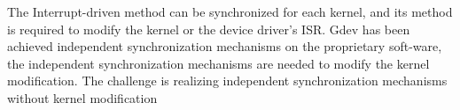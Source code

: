 The Interrupt-driven method can be synchronized for each kernel, and its method is required to modify the kernel or the device driver's ISR.
Gdev has been achieved independent synchronization mechanisms on the proprietary soft-ware,
the independent synchronization mechanisms are needed to modify the kernel modification.
The challenge is realizing independent synchronization mechanisms without kernel modification

